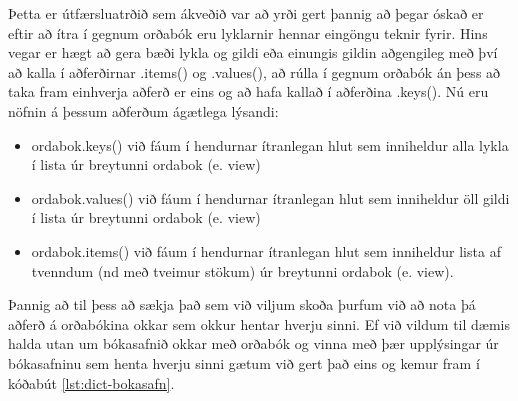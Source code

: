 Þetta er útfærsluatrðið sem ákveðið var að yrði gert þannig að þegar óskað er eftir að ítra í gegnum orðabók eru lyklarnir hennar eingöngu teknir fyrir.
Hins vegar er hægt að gera bæði lykla og gildi eða einungis gildin aðgengileg með því að kalla í aðferðirnar .items() og .values(), að rúlla í gegnum orðabók án þess að taka fram einhverja aðferð er eins og að hafa kallað í aðferðina .keys().
Nú eru nöfnin á þessum aðferðum ágætlega lýsandi:

\begin{itemize}
	\item ordabok.keys() við fáum í hendurnar ítranlegan hlut sem inniheldur alla lykla í lista úr breytunni ordabok (e. view)
	\item ordabok.values() við fáum í hendurnar ítranlegan hlut sem inniheldur öll gildi í lista úr breytunni ordabok (e. view)
	\item ordabok.items() við fáum í hendurnar ítranlegan hlut sem inniheldur lista af tvenndum (nd með tveimur stökum) úr breytunni ordabok (e. view).
\end{itemize}

Þannig að til þess að sækja það sem við viljum skoða þurfum við að nota þá aðferð á orðabókina okkar sem okkur hentar hverju sinni.
Ef við vildum til dæmis halda utan um bókasafnið okkar með orðabók og vinna með þær upplýsingar úr bókasafninu sem henta hverju sinni gætum við gert það eins og kemur fram í kóðabút \ref{lst:dict-bokasafn}.

